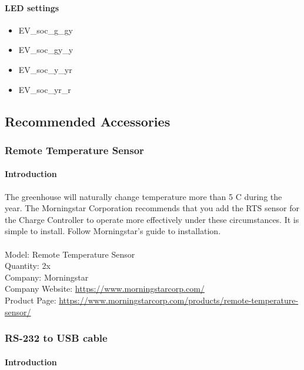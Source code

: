 \paragraph{LED settings}
\begin{itemize}
	\item EV\_soc\_g\_gy
	\item EV\_soc\_gy\_y
	\item EV\_soc\_y\_yr
	\item EV\_soc\_yr\_r
\end{itemize}
\par

\subsection{Recommended Accessories}

\subsubsection{Remote Temperature Sensor}

\paragraph{Introduction}

The greenhouse will naturally change temperature more than 5 C during the year. The Morningstar Corporation recommends that you add the RTS sensor for the Charge Controller to operate more effectively under these circumstances. It is simple to install. Follow Morningstar’s guide to installation.\\
\\
Model: Remote Temperature Sensor\\
Quantity: 2x\\
Company: Morningstar\\
Company Website: \href{https://www.morningstarcorp.com/}{https://www.morningstarcorp.com/}\\
Product Page: \href{https://www.morningstarcorp.com/products/remote-temperature-sensor/}{https://www.morningstarcorp.com/products/remote-temperature-sensor/
}
\par

\subsubsection{RS-232 to USB cable}

\paragraph{Introduction}

